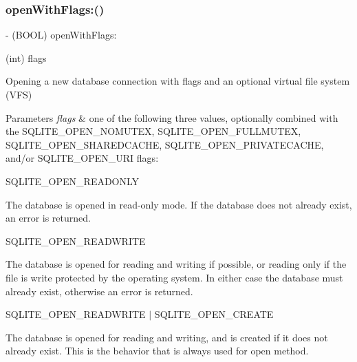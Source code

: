 \subsubsection{\texorpdfstring{open\+With\+Flags\+:()}{openWithFlags:()}}
{\footnotesize\ttfamily -\/ (B\+O\+OL) open\+With\+Flags\+: \begin{DoxyParamCaption}\item[{(int)}]{flags }\end{DoxyParamCaption}}

Opening a new database connection with flags and an optional virtual file system (V\+FS)


\begin{DoxyParams}{Parameters}
{\em flags} & one of the following three values, optionally combined with the {\ttfamily S\+Q\+L\+I\+T\+E\+\_\+\+O\+P\+E\+N\+\_\+\+N\+O\+M\+U\+T\+EX}, {\ttfamily S\+Q\+L\+I\+T\+E\+\_\+\+O\+P\+E\+N\+\_\+\+F\+U\+L\+L\+M\+U\+T\+EX}, {\ttfamily S\+Q\+L\+I\+T\+E\+\_\+\+O\+P\+E\+N\+\_\+\+S\+H\+A\+R\+E\+D\+C\+A\+C\+HE}, {\ttfamily S\+Q\+L\+I\+T\+E\+\_\+\+O\+P\+E\+N\+\_\+\+P\+R\+I\+V\+A\+T\+E\+C\+A\+C\+HE}, and/or {\ttfamily S\+Q\+L\+I\+T\+E\+\_\+\+O\+P\+E\+N\+\_\+\+U\+RI} flags\+:\\
\hline
\end{DoxyParams}
{\ttfamily S\+Q\+L\+I\+T\+E\+\_\+\+O\+P\+E\+N\+\_\+\+R\+E\+A\+D\+O\+N\+LY}

The database is opened in read-\/only mode. If the database does not already exist, an error is returned.

{\ttfamily S\+Q\+L\+I\+T\+E\+\_\+\+O\+P\+E\+N\+\_\+\+R\+E\+A\+D\+W\+R\+I\+TE}

The database is opened for reading and writing if possible, or reading only if the file is write protected by the operating system. In either case the database must already exist, otherwise an error is returned.

{\ttfamily S\+Q\+L\+I\+T\+E\+\_\+\+O\+P\+E\+N\+\_\+\+R\+E\+A\+D\+W\+R\+I\+TE $\vert$ S\+Q\+L\+I\+T\+E\+\_\+\+O\+P\+E\+N\+\_\+\+C\+R\+E\+A\+TE}

The database is opened for reading and writing, and is created if it does not already exist. This is the behavior that is always used for {\ttfamily open} method.

